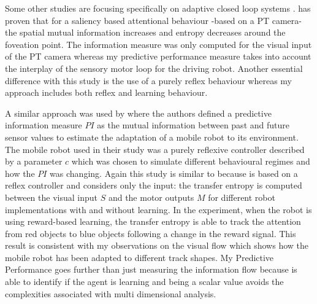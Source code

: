Some other studies are focusing specifically on adaptive closed loop systems \citep{Porr2006cf,Kulvicius2010:infomeasure,LungarellaSporns2006:MappingFlow}.
\citet{LungarellaInformationStructure} has proven that for a saliency based attentional behaviour
-based on a PT camera- 
the spatial mutual information increases and entropy decreases around the foveation point.
The information measure was only computed for the visual input of the 
PT camera whereas my predictive performance measure takes into
account the interplay of the sensory motor loop for the driving robot.
Another essential difference with this study is the use
of a purely reflex behaviour whereas my approach includes both
reflex and learning behaviour.

A similar approach was used by \citet{Der2008:PredictiveInfo,Ay2008:PredInformation}
 where the authors defined a predictive information measure $PI$ as the mutual
 information between past and future sensor values to estimate the adaptation
 of a mobile robot to its environment. The mobile robot used in their study was a purely 
reflexive controller described by a parameter $c$ which was chosen to simulate
 different behavioural regimes and how the $PI$ was changing.
Again this study is similar to \citet{LungarellaInformationStructure} because
 is based on a reflex controller and considers only the input:
the transfer entropy is computed between the visual input $S$ and the motor outputs
$M$ for different robot implementations with and without learning.
In the experiment, when the robot is using reward-based learning, the 
transfer entropy is able to track the attention from red objects to blue objects
following a change in the reward signal.
This result is consistent with my observations on the visual flow which shows
how the mobile robot has been adapted to different track shapes.
My Predictive Performance goes further than just measuring the 
information flow because is able to identify if the agent is learning
and being a scalar value avoids the complexities associated with multi dimensional analysis.

